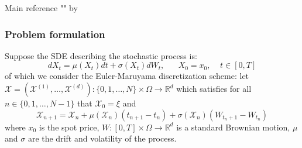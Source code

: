 \documentclass[9pt]{beamer} %
\begin{document}
\begin{frame}{}
\begin{block}{Main reference}
"" by \cite{becker2019deep}
\end{block}


    
\end{frame}

\begin{frame}
\frametitle{Problem formulation}
Suppose the SDE describing the stochastic process is:
\begin{equation*}\label{eq8}
    dX_t = \mu(X_t)dt + \sigma(X_t)d W_t, \;\;\;\;\;\; X_0=x_0, \;\;\;\; t \in [0,T]
\end{equation*}
of which we consider the Euler-Maruyama discretization scheme: let $\mathcal{X}=( \mathcal{X}^{(1)}, \ldots , \mathcal{X}^{(d)}): \{0, 1, \ldots, N \} \times \Omega \rightarrow \mathbb{R}^d $ which satisfies for all $n \in \{0, 1, \ldots, N-1 \}$ that $\mathcal{X}_0= \xi$ and 
\begin{equation}\label{eq9}
   \mathcal{X}_{n+1}=\mathcal{X}_n + \mu(\mathcal{X}_n)(t_{n+1}-t_n) + \sigma (\mathcal{X}_n)(W_{t_{n}+1}- W_{t_n}) 
\end{equation}
where $x_0$ is the spot price, $W: [0,T] \times \Omega \rightarrow \mathbb{R}^d$ is a standard Brownian motion, $\mu$ and $\sigma$ are the drift and volatility of the process.
\end{frame}
\end{document}
